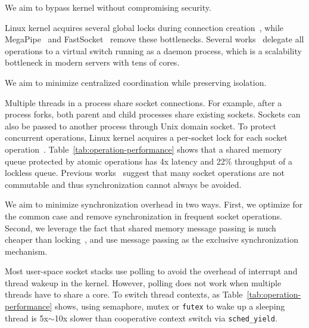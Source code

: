 We aim to bypass kernel without compromising security.


Linux kernel acquires several global locks during connection creation~\cite{boyd2008corey,boyd2010analysis}, while MegaPipe~\cite{han2012megapipe} and FastSocket~\cite{lin2016scalable} remove these bottlenecks.
Several works~\cite{martins2014clickos,roghanchi2017ffwd,huang2017high,freeflow} delegate all operations to a virtual switch running as a daemon process, which is a scalability bottleneck in modern servers with tens of cores.

We aim to minimize centralized coordination while preserving isolation.

Multiple threads in a process share socket connections.
For example, after a process forks, both parent and child processes share existing sockets.
Sockets can also be passed to another process through Unix domain socket.
To protect concurrent operations, Linux kernel acquires a per-socket lock for each socket operation~\cite{boyd2010analysis,han2012megapipe,lin2016scalable}.
Table~\ref{tab:operation-performance} shows that a shared memory queue protected by atomic operations has 4x latency and 22\% throughput of a lockless queue.
Previous works~\cite{boyd2010analysis,clements2015scalable} suggest that many socket operations are not commutable and thus synchronization cannot always be avoided.

We aim to minimize synchronization overhead in two ways.
First, we optimize for the common case and remove synchronization in frequent socket operations.
Second, we leverage the fact that shared memory message passing is much cheaper than locking~\cite{roghanchi2017ffwd}, and use message passing as the exclusive synchronization mechanism.


Most user-space socket stacks use polling to avoid the overhead of interrupt and thread wakeup in the kernel.
However, polling does not work when multiple threads have to share a core.
To switch thread contexts, as Table~\ref{tab:operation-performance} shows, using semaphore, mutex or \texttt{futex} to wake up a sleeping thread is 5x$\sim$10x slower than cooperative context switch via \texttt{sched\_yield}.

